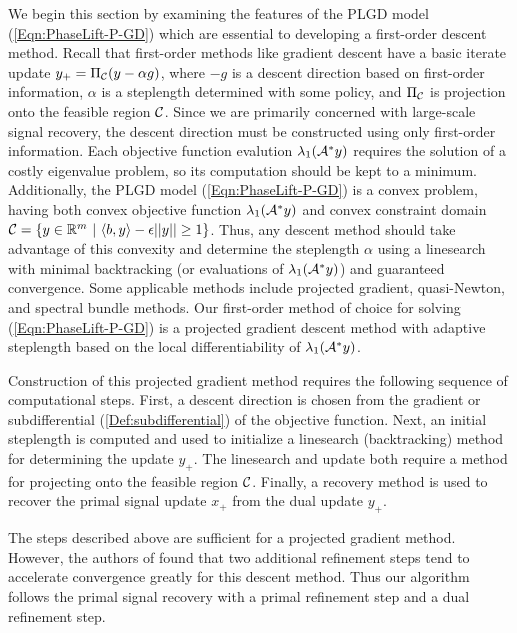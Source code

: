 We begin this section by examining the features of the PLGD model (\ref{Eqn:PhaseLift-P-GD}) which are essential to developing a first-order descent method.  
Recall that first-order methods like gradient descent have a basic iterate update $y_+ = \Pi_{\mathcal C}(y - \alpha g)$, where $-g$ is a descent direction based on first-order information, $\alpha$ is a steplength determined with some policy, and $\Pi_{\mathcal C}$ is projection onto the feasible region ${\mathcal C}$.  
Since we are primarily concerned with large-scale signal recovery, the descent direction must be constructed using only first-order information.  
Each objective function evalution $\lambda_1({\mathcal A}^*y)$ requires the solution of a costly eigenvalue problem, so its computation should be kept to a minimum.  
Additionally, the PLGD model (\ref{Eqn:PhaseLift-P-GD}) is a convex problem, having both convex objective function $\lambda_1({\mathcal A}^* y)$ and convex constraint domain ${\mathcal C} = \{ y \in \mathbb{R}^m \ | \ \langle b, y \rangle - \epsilon ||y|| \geq 1 \}$.   
Thus, any descent method should take advantage of this convexity and determine the steplength $\alpha$ using a linesearch with minimal backtracking (or evaluations of $\lambda_1({\mathcal A}^*y)$) and guaranteed convergence.  
Some applicable methods include projected gradient, quasi-Newton, and spectral bundle methods.  
Our first-order method of choice for solving (\ref{Eqn:PhaseLift-P-GD}) is a projected gradient descent method with adaptive steplength based on the local differentiability of $\lambda_1({\mathcal A}^* y)$.




Construction of this projected gradient method requires the following sequence of computational steps.  First, a descent direction is chosen from the gradient or subdifferential (\ref{Def:subdifferential}) of the objective function.  Next, an initial steplength is computed and used to initialize a linesearch (backtracking) method for determining the update $y_+$.  The linesearch and update both require a method for projecting onto the feasible region ${\mathcal C}$.  Finally, a recovery method is used to recover the primal signal update $x_+$ from the dual update $y_+$.

The steps described above are sufficient for a projected gradient method.  However, the authors of \cite{DBLP:journals/siamsc/FriedlanderM16} found that two additional refinement steps tend to accelerate convergence greatly for this descent method.  Thus our algorithm follows the primal signal recovery with a primal refinement step and a dual refinement step.




